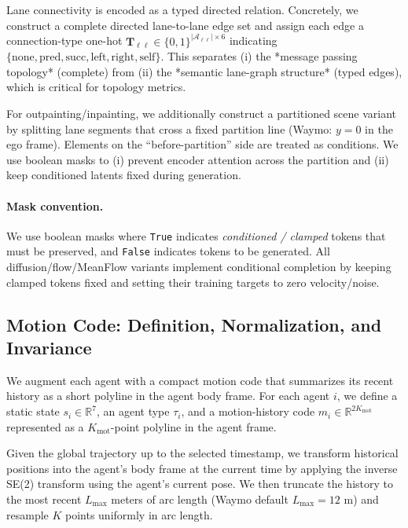 \documentclass{article}
\theoremstyle{plain}
\theoremstyle{definition}
\theoremstyle{remark}
\begin{document}
Lane connectivity is encoded as a typed directed relation. Concretely, we construct a complete directed lane-to-lane edge set
and assign each edge a connection-type one-hot \(\mathbf{T}_{\ell\ell}\in\{0,1\}^{|\mathcal{A}_{\ell\ell}|\times 6}\) indicating
\(\{\text{none},\text{pred},\text{succ},\text{left},\text{right},\text{self}\}\). This separates (i) the *message passing topology* (complete)
from (ii) the *semantic lane-graph structure* (typed edges), which is critical for topology metrics.

For outpainting/inpainting, we additionally construct a partitioned scene variant by splitting lane segments that cross a fixed
partition line (Waymo: \(y=0\) in the ego frame). Elements on the ``before-partition'' side are treated as conditions. We use
boolean masks to (i) prevent encoder attention across the partition and (ii) keep conditioned latents fixed during generation.

\paragraph{Mask convention.}
We use boolean masks where \texttt{True} indicates \emph{conditioned / clamped} tokens that must be preserved, and \texttt{False} indicates tokens to be generated.
All diffusion/flow/MeanFlow variants implement conditional completion by keeping clamped tokens fixed and setting their training targets to zero velocity/noise.

\subsection{Motion Code: Definition, Normalization, and Invariance}
\label{app:motion}

We augment each agent with a compact motion code that summarizes its recent history as a short polyline in the agent body frame.
For each agent \(i\), we define a static state \(s_i\in\mathbb{R}^{7}\), an agent type \(\tau_i\), and a motion-history code \(m_i\in\mathbb{R}^{2K_{\mathrm{mot}}}\) represented as a \(K_{\mathrm{mot}}\)-point polyline in the agent frame.

Given the global trajectory up to the selected timestamp, we transform historical positions into the agent's body frame at the
current time by applying the inverse SE(2) transform using the agent's current pose. We then truncate the history to the most
recent \(L_{\max}\) meters of arc length (Waymo default \(L_{\max}{=}12\) m) and resample \(K\) points uniformly in arc length.
\end{document}
